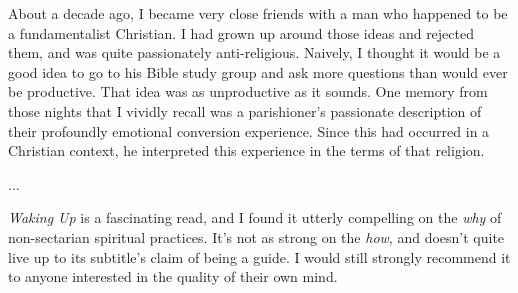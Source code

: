 \documentclass[a4paper, 12pt]{article}
\title{}
\author{Brendon J. Brewer}
\begin{document}
\sffamily
\maketitle

About a decade ago, I became very close friends with a man who happened to be
a fundamentalist Christian. I had grown up around those ideas and rejected
them, and was quite passionately anti-religious. Naively, I thought it would be
a good idea to go to his Bible study group and ask more questions than would
ever be productive. That idea was as unproductive as it sounds.
One memory from those nights that I vividly recall was a parishioner's
passionate description of their profoundly emotional conversion experience.
Since this had occurred in a Christian context, he interpreted this experience
in the terms of that religion.

...


{\em Waking Up} is a fascinating read, and I found it utterly
compelling on the {\em why} of non-sectarian spiritual practices. It's not as
strong on the {\em how}, and doesn't quite live up to its subtitle's claim of
being a guide. I would still strongly recommend it to anyone interested in
the quality of their own mind.
\end{document}
